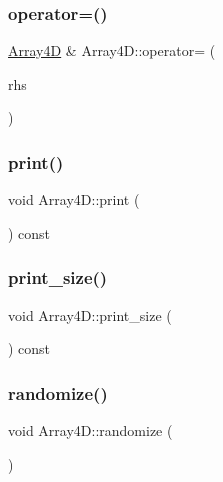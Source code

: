 \mbox{\label{class_array4_d_aa56a432098cf289a2cc340dfc5635634}} 
\subsubsection{\texorpdfstring{operator=()}{operator=()}}
{\footnotesize\ttfamily \mbox{\hyperlink{class_array4_d}{Array4D}} \& Array4\+D\+::operator= (\begin{DoxyParamCaption}\item[{const \mbox{\hyperlink{class_array4_d}{Array4D}} \&}]{rhs }\end{DoxyParamCaption})}

\mbox{\label{class_array4_d_ad4bf624213ab880802c14204a54bb1b4}} 
\subsubsection{\texorpdfstring{print()}{print()}}
{\footnotesize\ttfamily void Array4\+D\+::print (\begin{DoxyParamCaption}\item[{std\+::ostream \&}]{ }\end{DoxyParamCaption}) const}

\mbox{\label{class_array4_d_a838161eccbcb59c67d8ec5167e710cb2}} 
\subsubsection{\texorpdfstring{print\+\_\+size()}{print\_size()}}
{\footnotesize\ttfamily void Array4\+D\+::print\+\_\+size (\begin{DoxyParamCaption}\item[{std\+::ostream \&}]{ }\end{DoxyParamCaption}) const}

\mbox{\label{class_array4_d_a15626fe44d3792ccc2822afb30bcbd98}} 
\subsubsection{\texorpdfstring{randomize()}{randomize()}}
{\footnotesize\ttfamily void Array4\+D\+::randomize (\begin{DoxyParamCaption}{ }\end{DoxyParamCaption})}

